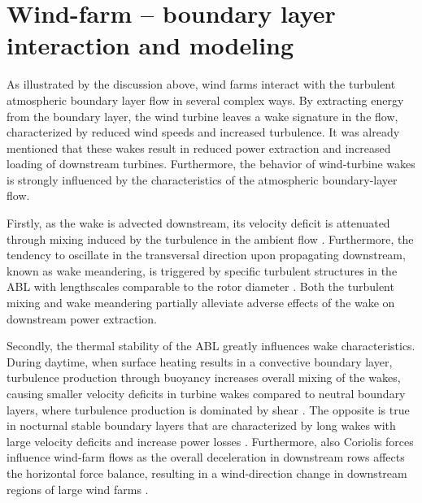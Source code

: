 \section{Wind-farm -- boundary layer interaction and modeling}\label{sec:intro_wfbl}
As illustrated by the discussion above, wind farms interact with the turbulent atmospheric boundary layer flow in several complex ways. By extracting energy from the boundary layer, the wind turbine leaves a wake signature in the flow, characterized by reduced wind speeds and increased turbulence. It was already mentioned that these wakes result in reduced power extraction and increased loading of downstream turbines. Furthermore, the behavior of wind-turbine wakes is strongly influenced by the characteristics of the atmospheric boundary-layer flow. 

Firstly, as the wake is advected downstream, its velocity deficit is attenuated through mixing induced by the turbulence in the ambient flow \citep{Chamorro2009}. Furthermore, the tendency to oscillate in the transversal direction upon propagating downstream, known as wake meandering, is triggered by specific turbulent structures in the ABL with lengthscales comparable to the rotor diameter \citep{espana2011spatial,espanawind}. Both the turbulent mixing and wake meandering partially alleviate adverse effects of the wake on downstream power extraction. 

Secondly, the thermal stability of the ABL greatly influences wake characteristics. During daytime, when surface heating results in a convective boundary layer, turbulence production through buoyancy increases overall mixing of the wakes, causing smaller velocity deficits in turbine wakes compared to neutral boundary layers, where turbulence production is dominated by shear \citep{zhang2013wind,abkar2015influence}. The opposite is true in nocturnal stable boundary layers that are characterized by long wakes with large velocity deficits and increase power losses \citep{barthelmie2010evaluation,dorenkamper}. Furthermore, also Coriolis forces influence wind-farm flows as the overall deceleration in downstream rows affects the horizontal force balance, resulting in a wind-direction change in downstream regions of large wind farms \citep{dorenkamper, allaerts2017boundary, van2017coriolis}.

